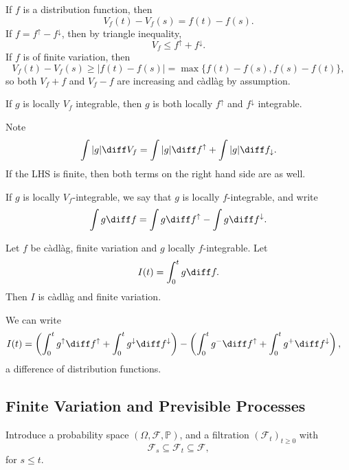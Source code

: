 \documentclass[12pt]{article}
\begin{document}
\begin{proofbox}
	If $f$ is a distribution function, then
	\[
	V_f(t) - V_f(s) = f(t) - f(s).
	\]
	If $f = f^\uparrow - f^\downarrow$, then by triangle inequality,
	\[
	V_f \leq f^\uparrow + f^\downarrow.
	\]
	If $f$ is of finite variation, then
	\[
		V_f(t) - V_f(s) \geq |f(t) - f(s)| = \max\{f(t) - f(s), f(s) - f(t)\},
	\]
	so both $V_f + f$ and $V_f - f$ are increasing and c\`adl\`ag by assumption.
\end{proofbox}

\begin{proposition}
	If $g$ is locally $V_f$ integrable, then $g$ is both locally $f^\uparrow$ and $f^\downarrow$ integrable.
\end{proposition}

\begin{proofbox}
	Note
	\[
	\int |g| \diff V_f = \int |g| \diff f^\uparrow + \int |g| \diff f_\downarrow.
	\]
	If the LHS is finite, then both terms on the right hand side are as well.
\end{proofbox}

\begin{definition}
	If $g$ is locally $V_f$-integrable, we say that $g$ is locally $f$-integrable, and write
	\[
	\int g \diff f = \int g \diff f^\uparrow - \int g \diff f^\downarrow.
	\]
\end{definition}

\begin{theorem}
	Let $f$ be c\`adl\`ag, finite variation and $g$ locally $f$-integrable. Let
	\[
	I(t) = \int_0^t g \diff f.
	\]
	Then $I$ is c\`adl\`ag and finite variation.
\end{theorem}

\begin{proofbox}
	We can write
	\begin{align*}
		I(t) &= \left( \int_0^t g^{\uparrow} \diff f^{\uparrow} + \int_0^t g^{\downarrow} \diff f^{\downarrow} \right) - \left( \int_0^t g^{-} \diff f^{\uparrow} + \int_0^t g^{+} \diff f^{\downarrow} \right),
	\end{align*}
	a difference of distribution functions.
\end{proofbox}

\subsection{Finite Variation and Previsible Processes}%
\label{sub:fvp}

Introduce a probability space $(\Omega, \mathcal{F}, \mathbb{P})$, and a filtration $(\mathcal{F}_t)_{t \geq 0}$ with
\[
\mathcal{F}_s \subseteq \mathcal{F}_t \subseteq \mathcal{F},
\]
for $s \leq t$.
\end{document}
